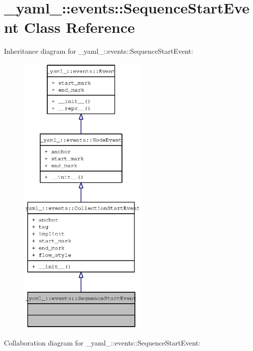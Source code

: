 \section{\_\-yaml\_\-::events::SequenceStartEvent Class Reference}
\label{class__yaml___1_1events_1_1SequenceStartEvent}
Inheritance diagram for \_\-yaml\_\-::events::SequenceStartEvent:\nopagebreak
\begin{figure}[H]
\begin{center}
\leavevmode
\includegraphics[height=400pt]{class__yaml___1_1events_1_1SequenceStartEvent__inherit__graph}
\end{center}
\end{figure}
Collaboration diagram for \_\-yaml\_\-::events::SequenceStartEvent:\nopagebreak
